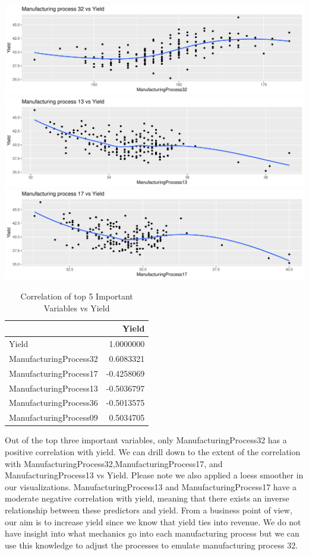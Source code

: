\documentclass[]{report}
\begin{document}
\includegraphics{Homework-Two_files/figure-latex/kj-6.3f-1.pdf}
\includegraphics{Homework-Two_files/figure-latex/kj-6.3f-2.pdf}
\includegraphics{Homework-Two_files/figure-latex/kj-6.3f-3.pdf}

\begin{table}[H]

\caption{\label{tab:kj-6.3f}Correlation of top 5 Important Variables vs Yield}
\centering
\begin{tabular}{l|r}
\hline
  & Yield\\
\hline
\rowcolor{gray!6}  Yield & 1.0000000\\
\hline
ManufacturingProcess32 & 0.6083321\\
\hline
\rowcolor{gray!6}  ManufacturingProcess17 & -0.4258069\\
\hline
ManufacturingProcess13 & -0.5036797\\
\hline
\rowcolor{gray!6}  ManufacturingProcess36 & -0.5013575\\
\hline
ManufacturingProcess09 & 0.5034705\\
\hline
\end{tabular}
\end{table}

Out of the top three important variables, only ManufacturingProcess32
has a positive correlation with yield. We can drill down to the extent
of the correlation with ManufacturingProcess32,ManufacturingProcess17,
and ManufacturingProcess13 vs Yield. Please note we also applied a loess
smoother in our visualizations. ManufacturingProcess13 and
ManufacturingProcess17 have a moderate negative correlation with yield,
meaning that there exists an inverse relationship between these
predictors and yield. From a business point of view, our aim is to
increase yield since we know that yield ties into revenue. We do not
have insight into what mechanics go into each manufacturing process but
we can use this knowledge to adjust the processes to emulate
manufacturing process 32.
\end{document}
